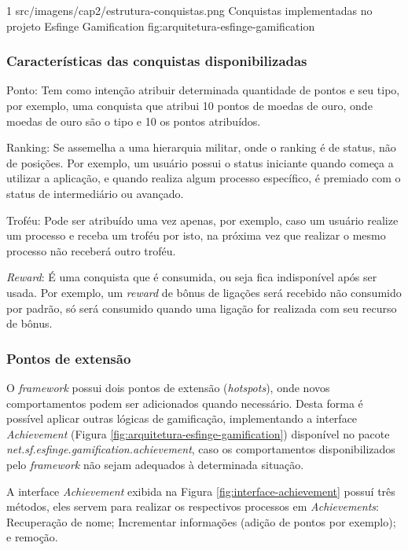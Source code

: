\begin{image}
{1} %
{src/imagens/cap2/estrutura-conquistas.png} %
{Conquistas implementadas no projeto Esfinge Gamification} %
{fig:arquitetura-esfinge-gamification} %
{} %
\end{image}

\subsubsection{Características das conquistas disponibilizadas}

\par Ponto: Tem como intenção atribuir determinada quantidade de pontos e seu tipo, por exemplo, uma conquista que atribui 10 pontos de moedas de ouro, onde moedas de ouro são o tipo e 10 os pontos atribuídos. 
\par Ranking: Se assemelha a uma hierarquia militar, onde o ranking é de status, não de posições. Por exemplo, um usuário possui o status iniciante quando começa a utilizar a aplicação, e quando realiza algum processo específico, é premiado com o status de intermediário ou avançado.

\par Troféu: Pode ser atribuído uma vez apenas, por exemplo, caso um usuário realize um processo e receba um troféu por isto, na próxima vez que realizar o mesmo processo não receberá outro troféu.

\par \textit{Reward}: É uma conquista que é consumida, ou seja fica indisponível após ser usada. Por exemplo, um \textit{reward} de bônus de ligações será recebido não consumido por padrão, só será consumido quando uma ligação for realizada com seu recurso de bônus.

\subsubsection{Pontos de extensão}

O \textit{framework} possui dois pontos de extensão (\textit{hotspots}), onde novos comportamentos podem ser adicionados quando necessário. Desta forma é possível aplicar outras lógicas de gamificação, implementando a interface \textit{Achievement} (Figura \ref{fig:arquitetura-esfinge-gamification}) disponível no pacote \textit{net.sf.esfinge.gamification.achievement}, caso os comportamentos disponibilizados pelo \textit{framework} não sejam adequados \`a determinada situação. 
\par A interface \textit{Achievement} exibida na Figura \ref{fig:interface-achievement} possuí três métodos, eles servem para realizar os respectivos processos em \textit{Achievements}: Recuperação de nome; Incrementar informações (adição de pontos por exemplo); e remoção.

